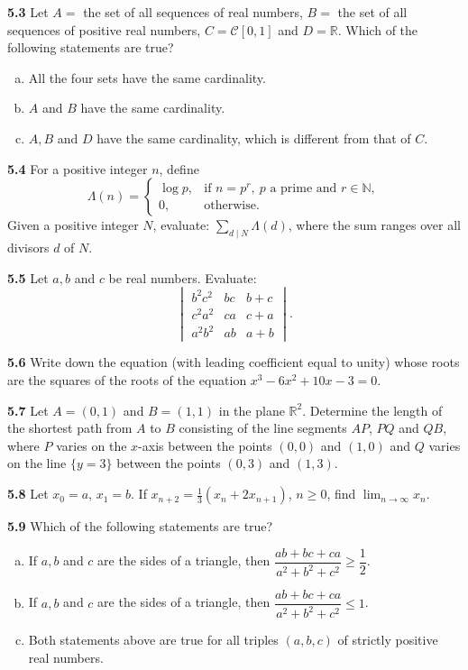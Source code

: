 \documentclass[11pt,a4paper]{article}
\newcommand{\N}{\mathbb{N}}
\newcommand{\R}{\mathbb{R}}
\newcommand{\qitem}[1]{\par\medskip\noindent\textbf{#1}\hspace{0.5em}}
\begin{document}
\qitem{5.3} Let $A =$ the set of all sequences of real numbers, $B =$ the set of all sequences of positive real numbers, $C = \mathcal{C}[0, 1]$ and $D = \R$. Which of the following statements are true?
\begin{enumerate}[a.]
  \item All the four sets have the same cardinality.
  \item $A$ and $B$ have the same cardinality.
  \item $A, B$ and $D$ have the same cardinality, which is different from that of $C$.
\end{enumerate}

\qitem{5.4} For a positive integer $n$, define
\[
  \Lambda(n) = \begin{cases} \log p, & \text{if } n = p^r,\ p \text{ a prime and } r \in \N, \\ 0, & \text{otherwise.} \end{cases}
\]
Given a positive integer $N$, evaluate: $\displaystyle\sum_{d \mid N} \Lambda(d)$, where the sum ranges over all divisors $d$ of $N$.

\qitem{5.5} Let $a, b$ and $c$ be real numbers. Evaluate:
\[
  \begin{vmatrix}
    b^2 c^2 & bc & b + c \\
    c^2 a^2 & ca & c + a \\
    a^2 b^2 & ab & a + b
  \end{vmatrix}.
\]

\qitem{5.6} Write down the equation (with leading coefficient equal to unity) whose roots are the squares of the roots of the equation $x^3 - 6x^2 + 10x - 3 = 0$.

\qitem{5.7} Let $A = (0, 1)$ and $B = (1, 1)$ in the plane $\R^2$. Determine the length of the shortest path from $A$ to $B$ consisting of the line segments $AP$, $PQ$ and $QB$, where $P$ varies on the $x$-axis between the points $(0, 0)$ and $(1, 0)$ and $Q$ varies on the line $\{y = 3\}$ between the points $(0, 3)$ and $(1, 3)$.

\qitem{5.8} Let $x_0 = a$, $x_1 = b$. If $x_{n+2} = \frac{1}{3}(x_n + 2x_{n+1})$, $n \ge 0$, find $\lim_{n \to \infty} x_n$.

\qitem{5.9} Which of the following statements are true?
\begin{enumerate}[a.]
  \item If $a, b$ and $c$ are the sides of a triangle, then $\dfrac{ab + bc + ca}{a^2 + b^2 + c^2} \ge \dfrac{1}{2}$.
  \item If $a, b$ and $c$ are the sides of a triangle, then $\dfrac{ab + bc + ca}{a^2 + b^2 + c^2} \le 1$.
  \item Both statements above are true for all triples $(a, b, c)$ of strictly positive real numbers.
\end{enumerate}
\end{document}
